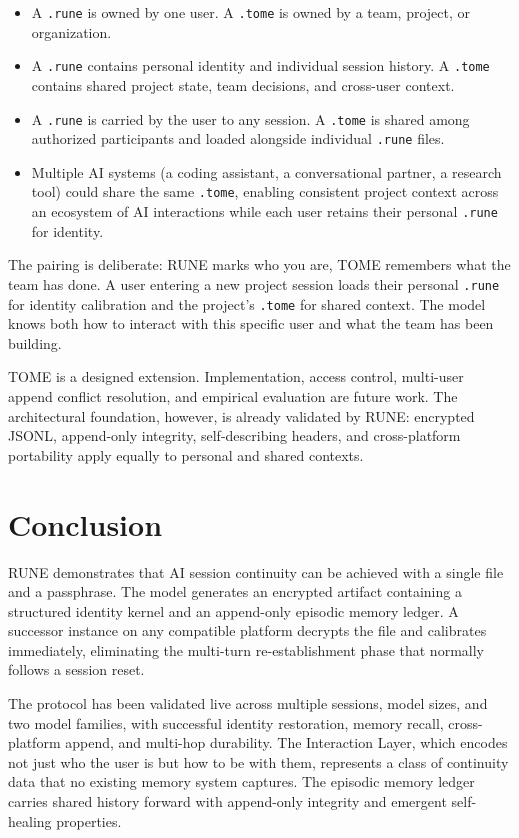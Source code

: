 \documentclass[11pt,a4paper]{article}
\begin{document}
\begin{itemize}
    \item A \texttt{.rune} is owned by one user. A \texttt{.tome} is owned by a team, project, or organization.
    \item A \texttt{.rune} contains personal identity and individual session history. A \texttt{.tome} contains shared project state, team decisions, and cross-user context.
    \item A \texttt{.rune} is carried by the user to any session. A \texttt{.tome} is shared among authorized participants and loaded alongside individual \texttt{.rune} files.
    \item Multiple AI systems (a coding assistant, a conversational partner, a research tool) could share the same \texttt{.tome}, enabling consistent project context across an ecosystem of AI interactions while each user retains their personal \texttt{.rune} for identity.
\end{itemize}

The pairing is deliberate: RUNE marks who you are, TOME remembers what the team has done. A user entering a new project session loads their personal \texttt{.rune} for identity calibration and the project's \texttt{.tome} for shared context. The model knows both how to interact with this specific user and what the team has been building.

TOME is a designed extension. Implementation, access control, multi-user append conflict resolution, and empirical evaluation are future work. The architectural foundation, however, is already validated by RUNE: encrypted JSONL, append-only integrity, self-describing headers, and cross-platform portability apply equally to personal and shared contexts.

\section{Conclusion}

RUNE demonstrates that AI session continuity can be achieved with a single file and a passphrase. The model generates an encrypted artifact containing a structured identity kernel and an append-only episodic memory ledger. A successor instance on any compatible platform decrypts the file and calibrates immediately, eliminating the multi-turn re-establishment phase that normally follows a session reset.

The protocol has been validated live across multiple sessions, model sizes, and two model families, with successful identity restoration, memory recall, cross-platform append, and multi-hop durability. The Interaction Layer, which encodes not just who the user is but how to be with them, represents a class of continuity data that no existing memory system captures. The episodic memory ledger carries shared history forward with append-only integrity and emergent self-healing properties.
\end{document}
